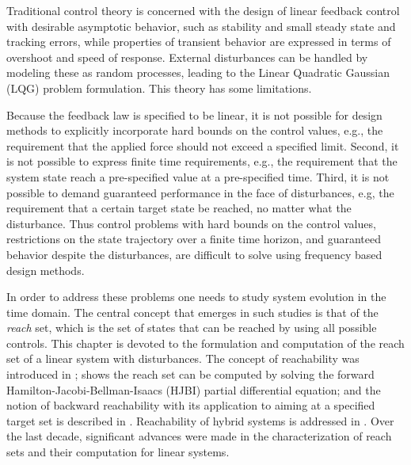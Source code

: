 Traditional control theory is concerned with the design
of linear feedback control with desirable asymptotic behavior,
such as stability and small steady state and tracking errors,
while properties of transient behavior are expressed in terms
of overshoot and speed of response.
External disturbances can be handled by modeling these as random processes,
leading to the Linear Quadratic Gaussian (LQG) problem formulation.
This theory has some limitations.  

Because the feedback law is specified to be linear,
it is not possible for design methods to explicitly incorporate hard bounds
on the control values, e.g.,
the requirement that the applied force should not exceed a specified limit.
Second, it is not possible to express finite time requirements, e.g.,
the requirement that the system state reach a pre-specified value
at a pre-specified time.
Third, it is not possible to demand guaranteed performance in the face
of disturbances, e.g, the requirement that a certain target state be reached,
no matter what the disturbance.
Thus control problems with hard bounds on the control values,
restrictions on the state trajectory over a finite time horizon,
and guaranteed behavior despite the disturbances,
are difficult to solve using frequency based design methods.

In order to address these problems one needs to study system evolution
in the time domain.
The central concept that emerges in  such studies is that of the \emph{reach}
set, which is the set of states that can be reached by using all possible
controls. 
This chapter is devoted to the formulation and computation
of the reach set of a linear system with disturbances.
The concept of reachability was introduced in \cite{leemarkus};
\cite{leitmann82} shows the reach set can be computed by solving
the forward Hamilton-Jacobi-Bellman-Isaacs (HJBI) partial differential
equation; and the notion of backward reachability with its application
to aiming at a specified target set is described in \cite{krasovski}.
Reachability of hybrid systems is addressed in \cite{purvar94, lygeros99}.
Over the last decade, significant advances were made in
the characterization of reach sets and their computation for linear systems.









